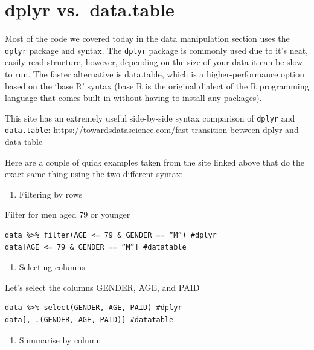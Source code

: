 \documentclass[
  12pt,
]{article}
\providecommand{\tightlist}{%
  \setlength{\itemsep}{0pt}\setlength{\parskip}{0pt}}
\begin{document}
\hypertarget{dplyr-vs.-data.table}{%
\section{dplyr vs.~data.table}\label{dplyr-vs.-data.table}}

Most of the code we covered today in the data manipulation section uses
the \texttt{dplyr} package and syntax. The \texttt{dplyr} package is
commonly used due to it's neat, easily read structure, however,
depending on the size of your data it can be slow to run. The faster
alternative is data.table, which is a higher-performance option based on
the `base R' syntax (base R is the original dialect of the R programming
language that comes built-in without having to install any packages).

This site has an extremely useful side-by-side syntax comparison of
\texttt{dplyr} and \texttt{data.table}:
\href{https://towardsdatascience.com/fast-transition-between-dplyr-and-data-table-c02d53cb769f}{https://towardsdatascience.com/fast-transition-between-dplyr-and-data-table}

Here are a couple of quick examples taken from the site linked above
that do the exact same thing using the two different syntax:

\begin{enumerate}
\def\labelenumi{\arabic{enumi}.}
\tightlist
\item
  Filtering by rows
\end{enumerate}

Filter for men aged 79 or younger

\begin{verbatim}
data %>% filter(AGE <= 79 & GENDER == “M”) #dplyr
data[AGE <= 79 & GENDER == “M”] #datatable
\end{verbatim}

\begin{enumerate}
\def\labelenumi{\arabic{enumi}.}
\setcounter{enumi}{1}
\tightlist
\item
  Selecting columns
\end{enumerate}

Let's select the columns GENDER, AGE, and PAID

\begin{verbatim}
data %>% select(GENDER, AGE, PAID) #dplyr
data[, .(GENDER, AGE, PAID)] #datatable
\end{verbatim}

\begin{enumerate}
\def\labelenumi{\arabic{enumi}.}
\setcounter{enumi}{2}
\tightlist
\item
  Summarise by column
\end{enumerate}
\end{document}
